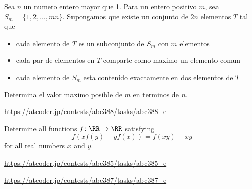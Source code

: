 \documentclass[11pt]{scrartcl}
\begin{document}
\begin{problem}
Sea $n$ un numero entero mayor que 1. Para un entero positivo $m$, sea $S_m=\{ 1,2,\ldots ,mn \}.$ Supongamos que existe un conjunto de $2n$ elementos $T$ tal que 
\begin{itemize}
\item cada elemento de $T$ es un subconjunto de $S_m$ con $m$ elementos
\item cada par de elementos en $T$ comparte como maximo un elemento comun
\item cada elemento de $S_m$ esta contenido exactamente en dos elementos de $T$
\end{itemize}
Determina el valor maximo posible de $m$ en terminos de $n$.
\end{problem}
\begin{problem}[AC ABC388E]
\url{https://atcoder.jp/contests/abc388/tasks/abc388_e}
\end{problem}
\begin{problem}
  Determine all functions $f \colon \RR \to \RR$ satisfying
  \[ f\left( xf(y)-yf(x) \right) = f(xy)-xy \]
  for all real numbers $x$ and $y$.

\end{problem}
\begin{problem}[AC ABC385E]
\url{https://atcoder.jp/contests/abc385/tasks/abc385_e}
\end{problem}
\begin{problem}[AC ABC387E]
\url{https://atcoder.jp/contests/abc387/tasks/abc387_e}
\end{problem}
\end{document}
